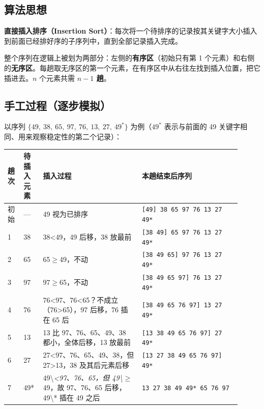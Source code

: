 \documentclass[11pt,openany,UTF8]{ctexbook}
\begin{document}
\subsection{算法思想}

\textbf{直接插入排序（Insertion Sort）}：每次将一个待排序的记录按其关键字大小插入到前面已经排好序的子序列中，直到全部记录插入完成。

整个序列在逻辑上被划为两部分：左侧的\textbf{有序区}（初始只有第 1 个元素）和右侧的\textbf{无序区}。每趟取无序区的第一个元素，在有序区中从右往左找到插入位置，把它插进去。$n$ 个元素共需 \textbf{$n-1$ 趟}。

\subsection{手工过程（逐步模拟）}

以序列 $\{49,\ 38,\ 65,\ 97,\ 76,\ 13,\ 27,\ 49^*\}$ 为例（$49^*$ 表示与前面的 49 关键字相同、用来观察稳定性的第二个记录）：

\begingroup\small\setlength{\tabcolsep}{4.0pt}
\begin{longtable}{@{}L{0.0683\linewidth}L{0.0683\linewidth}L{0.3854\linewidth}L{0.3892\linewidth}@{}}
\toprule
\textbf{趟次} & \textbf{待插入元素} & \textbf{插入过程} & \textbf{本趟结束后序列} \\
\midrule
\endhead
初始 & — & 49 视为已排序 & \texttt{[49]\allowbreak{} 38 65 97 76 13 27 49*} \\
1 & 38 & 38<49，49 后移，38 放最前 & \texttt{[38 49]\allowbreak{} 65 97 76 13 27 49*} \\
2 & 65 & 65$\ge$49，不动 & \texttt{[38 49 65]\allowbreak{} 97 76 13 27 49*} \\
3 & 97 & 97$\ge$65，不动 & \texttt{[38 49 65 97]\allowbreak{} 76 13 27 49*} \\
4 & 76 & 76<97、76<65？不成立（76>65），97 后移，76 插在 65 后 & \texttt{[38 49 65 76 97]\allowbreak{} 13 27 49*} \\
5 & 13 & 13 比 97、76、65、49、38 都小，全体后移，13 放最前 & \texttt{[13 38 49 65 76 97]\allowbreak{} 27 49*} \\
6 & 27 & 27<97、76、65、49、38，但 27>13，38 及其后元素后移 & \texttt{[13 27 38 49 65 76 97]\allowbreak{} 49*} \\
7 & 49* & 49\textbackslash{}\emph{<97、76、65，但 49\textbackslash{}}$\ge$49，故 97、76、65 后移，49\textbackslash{}* 插在 49 之后 & \texttt{13 27 38 49 49* 65 76 97} \\
\bottomrule
\end{longtable}
\endgroup
\end{document}
